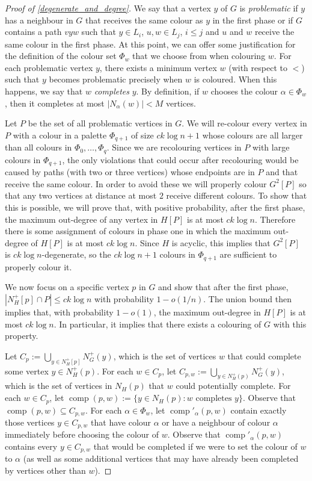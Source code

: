 \documentclass{patmorin}
\newcommand{\defin}[1]{\emph{\color{brightmaroon}#1}}
\DeclareMathOperator{\comp}{comp}
\begin{document}
\begin{proof}[Proof of \cref{degenerate_and_degree}]
  We say that a vertex $y$ of $G$ is \defin{problematic} if $y$ has a neighbour in $G$ that receives the same colour as $y$ in the first phase or if $G$ contains a path $vyw$ such that $y\in L_i$, $u,w\in L_j$, $i \le j$ and $u$ and $w$ receive the same colour in the first phase.  At this point, we can offer some justification for the definition of the colour set $\Phi_w$ that we choose from when colouring $w$. For each problematic vertex $y$, there exists a minimum vertex $w$ (with respect to $<$) such that $y$ becomes problematic precisely when $w$ is coloured.  When this happens, we say that $w$ \defin{completes} $y$. By definition, if $w$ chooses the colour $\alpha\in\Phi_w$, then it completes at most $|N_{\alpha}(w)|<M$ vertices.

  Let $P$ be the set of all problematic vertices in $G$.  We will re-colour every vertex in $P$ with a colour in a palette $\Phi_{q+1}$ of size $ck\log n + 1$ whose colours are all larger than all colours in $\Phi_0,\ldots,\Phi_q$.  Since we are recolouring vertices in $P$ with large colours in $\Phi_{q+1}$, the only violations that could occur after recolouring would be caused by paths (with two or three vertices) whose endpoints are in $P$ and that receive the same colour.  In order to avoid these we will properly colour $G^2[P]$ so that any two vertices at distance at most $2$ receive different colours.  To show that this is possible, we will prove that, with positive probability, after the first phase, the maximum out-degree of any vertex in $H[P]$ is at most $ck\log n$.  Therefore there is some assignment of colours in phase one in which the maximum out-degree of $H[P]$ is at most $ck\log n$.  Since $H$ is acyclic, this implies that $G^2[P]$ is $ck\log n$-degenerate, so the $ck\log n + 1$ colours in $\Phi_{q+1}$ are sufficient to properly colour it.

  We now focus on a specific vertex $p$ in $G$ and show that after the first phase, $|N^+_{H}[p]\cap P|\le ck\log n$ with probability $1-o(1/n)$.  The union bound then implies that, with probability $1-o(1)$, the maximum out-degree in $H[P]$ is at most $ck\log n$.  In particular, it implies that there exists a colouring of $G$ with this property.

  Let $C_p:=\bigcup_{y\in N^+_H[p]} N^+_G(y)$, which is the set of vertices $w$ that could complete some vertex $y\in N^+_H(p)$. For each $w\in C_p$, let
  $C_{p,w}:=\bigcup_{y\in N^+_{H}(p)} N^+_{G}(y)$, which is the set of vertices in $N_{H}(p)$ that $w$ could potentially complete. For each $w\in C_p$, let $\comp(p,w):=\{y\in N_{H}(p):\text{$w$ completes $y$}\}$. Observe that $\comp(p,w)\subseteq C_{p,w}$.  For each $\alpha\in\Phi_w$, let $\comp'_\alpha(p,w)$ contain exactly those vertices $y\in C_{p,w}$ that have colour $\alpha$ or have a neighbour of colour $\alpha$ immediately before choosing the colour of $w$.  Observe that $\comp'_\alpha(p,w)$ contains every $y\in C_{p,w}$ that would be completed if we were to set the colour of $w$ to $\alpha$ (as well as some additional vertices that may have already been completed by vertices other than $w$).


\end{proof}
\end{document}
